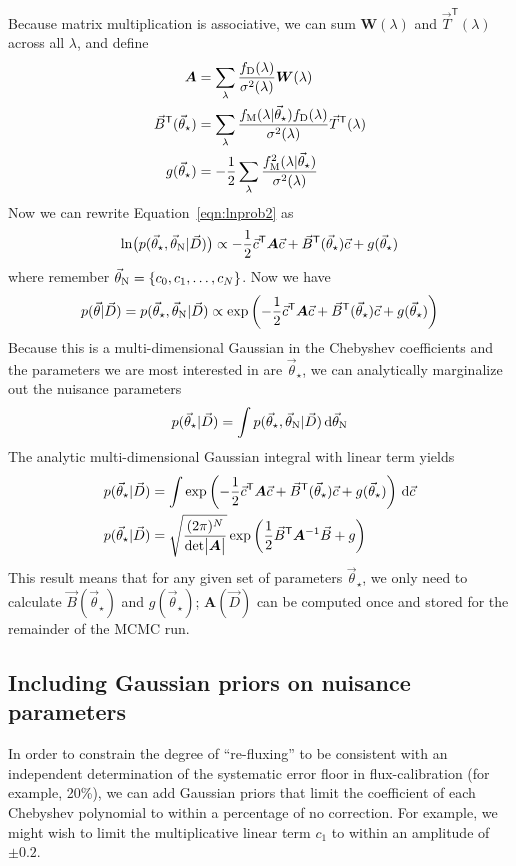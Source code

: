 \documentclass[preprint]{aastex} %
\newcommand{\vt}{\vec{\theta}}
\newcommand{\vstar}{\vt_{\star}}
\newcommand{\vN}{\vt_{\rm N}}
\newcommand{\vc}{\vec{c}}
\newcommand{\fM}{f_{\rm M}}
\newcommand{\fD}{f_{\rm D}}
\newcommand{\vD}{\vec{D}}
\newcommand{\dd}{\,{\rm d}}
\newcommand{\trans}{\mathsf{T}}
\begin{document}
Because matrix multiplication is associative, we can sum ${\bm W(\lambda)}$ and $\vec{T}^\trans(\lambda)$ across all $\lambda$, and define
\begin{align}
  {\bm A} &= \sum_\lambda \frac{\fD(\lambda)}{\sigma^2(\lambda)} {\bm W}(\lambda)\\
  \vec{B}^\trans(\vstar) &= \sum_\lambda \frac{\fM(\lambda | \vstar) \fD(\lambda)}{\sigma^2(\lambda)} \vec{T}^\trans(\lambda)\\
  g(\vstar) &= -\frac{1}{2} \sum_\lambda \frac{\fM^2(\lambda|\vstar)}{\sigma^2(\lambda)}\\
\end{align}
Now we can rewrite Equation~\ref{eqn:lnprob2} as 
\begin{equation}
  \ln \bigl (p(\vstar, \vN | \vD) \bigr) \propto - \frac{1}{2} \vc^\trans {\bm A} \vc + \vec{B}^\trans(\vstar) \vc + g(\vstar)
  \label{eqn:lnprob_matrix}
\end{equation}
where remember $\vN = \{c_0, c_1, \ldots, c_N \}$. Now we have
\begin{equation}
  p(\vt | \vD) = p(\vstar, \vN | \vD) \propto \exp \left ( - \frac{1}{2} \vc^\trans {\bm A} \vc + \vec{B}^\trans(\vstar) \vc + g(\vstar) \right )
  \label{eqn:posterior_vec}
\end{equation}
Because this is a multi-dimensional Gaussian in the Chebyshev coefficients and the parameters we are most interested in are $\vstar$, we can analytically marginalize out the nuisance parameters
\begin{equation}
  p(\vstar | \vD) = \int p(\vstar, \vN | \vD) \dd \vN
\end{equation}
The analytic multi-dimensional Gaussian integral with linear term \citep{sgd+09} yields 
\begin{align}
  p(\vstar | \vD) &= \int \exp \left ( - \frac{1}{2} \vc^\trans {\bm A} \vc + \vec{B}^\trans(\vstar) \vc + g(\vstar) \right ) \dd \vc\\
  p(\vstar | \vD) &= \sqrt{\frac{(2 \pi )^N}{ {\rm det} \bigl |{\bm A} \bigr |}} \exp{ \left ( \frac{1}{2} \vec{B}^\trans {\bm A}^{-1} \vec{B} + g \right )}
\end{align}
This result means that for any given set of parameters $\vstar$, we only need to calculate $\vec{B}(\vstar)$ and $g(\vstar)$; ${\bm A}(\vD)$ can be computed once and stored for the remainder of the MCMC run.

\subsection{Including Gaussian priors on nuisance parameters}
In order to constrain the degree of ``re-fluxing'' to be consistent with an independent determination of the systematic error floor in flux-calibration (for example, 20\%), we can add Gaussian priors that limit the coefficient of each Chebyshev polynomial to within a percentage of no correction. For example, we might wish to limit the multiplicative linear term $c_1$ to within an amplitude of $\pm 0.2$.
\end{document}
